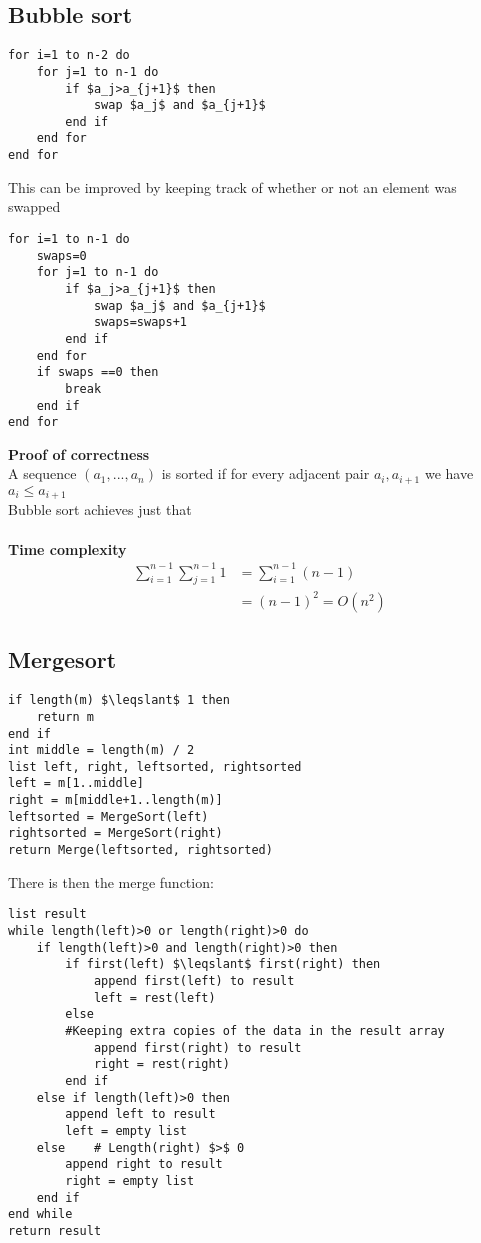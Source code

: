 \documentclass{article}[18pt]
\begin{document}
\subsection{Bubble sort}
\begin{lstlisting}[caption={BubbleSort-1 $(a_1,...,a_n\in \mathbb{R}, n\geqslant 2)$}]
for i=1 to n-2 do
	for j=1 to n-1 do
		if $a_j>a_{j+1}$ then
			swap $a_j$ and $a_{j+1}$
		end if
	end for
end for		
\end{lstlisting}
This can be improved by keeping track of whether or not an element was swapped
\begin{lstlisting}[caption={BubbleSort-1 $(a_1,...,a_n\in \mathbb{R}, n\geqslant 2)$}]
for i=1 to n-1 do
	swaps=0
	for j=1 to n-1 do
		if $a_j>a_{j+1}$ then
			swap $a_j$ and $a_{j+1}$
			swaps=swaps+1
		end if
	end for
	if swaps ==0 then
		break
	end if
end for		
\end{lstlisting}
\textbf{Proof of correctness}\\
A sequence $(a_1,...,a_n)$ is sorted if for every adjacent pair $a_i,a_{i+1}$ we have $a_i\leqslant a_{i+1}$\\
Bubble sort achieves just that\\
\\
\textbf{Time complexity}
\[
\begin{aligned} \sum_{i=1}^{n-1} \sum_{j=1}^{n-1} 1 &=\sum_{i=1}^{n-1}(n-1) \\ &=(n-1)^{2}=O\left(n^{2}\right) \end{aligned}
\]
\subsection{Mergesort}
\begin{lstlisting}[caption={list MergeSort (list m)}]
if length(m) $\leqslant$ 1 then
	return m
end if
int middle = length(m) / 2
list left, right, leftsorted, rightsorted
left = m[1..middle]
right = m[middle+1..length(m)]
leftsorted = MergeSort(left)
rightsorted = MergeSort(right)
return Merge(leftsorted, rightsorted)
\end{lstlisting}
There is then the merge function:
\begin{lstlisting}[caption={list MergeSort (list left, list right)}]
list result
while length(left)>0 or length(right)>0 do
	if length(left)>0 and length(right)>0 then
		if first(left) $\leqslant$ first(right) then
			append first(left) to result
			left = rest(left)
		else
		#Keeping extra copies of the data in the result array
			append first(right) to result
			right = rest(right)
		end if
	else if length(left)>0 then
		append left to result
		left = empty list
	else 	# Length(right) $>$ 0
		append right to result
		right = empty list
	end if
end while
return result
\end{lstlisting}
\end{document}
